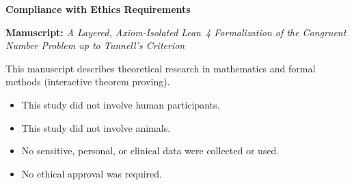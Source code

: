 \documentclass[11pt,a4paper]{article}
\begin{document}
\thispagestyle{empty}

\begin{center}
{\large\bfseries Compliance with Ethics Requirements}
\end{center}

\bigskip

\noindent
\textbf{Manuscript:} \emph{A Layered, Axiom-Isolated Lean~4
Formalization of the Congruent Number Problem up to Tunnell's
Criterion}

\bigskip

\noindent
This manuscript describes theoretical research in mathematics and
formal methods (interactive theorem proving).

\begin{itemize}
  \item This study did not involve human participants.
  \item This study did not involve animals.
  \item No sensitive, personal, or clinical data were collected or used.
  \item No ethical approval was required.
\end{itemize}
\end{document}
